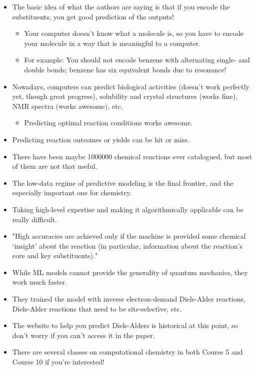 \documentclass[../notes.tex]{subfiles}
\begin{document}
\begin{itemize}
\begin{itemize}
    \end{itemize}
    \item The basic idea of what the authors are saying is that if you encode the substituents, you get good prediction of the outputs!
    \begin{itemize}
        \item Your computer doesn't know what a molecule is, so you have to encode your molecule in a way that is meaningful to a computer.
        \item For example: You should not encode benzene with alternating single- and double bonds; benzene has six equivalent bonds due to resonance!
    \end{itemize}
    \item Nowadays, computers can predict biological activities (doesn't work perfectly yet, though great progress), solubility and crystal structures (works fine), NMR spectra (works awesome), etc.
    \begin{itemize}
        \item Predicting optimal reaction conditions works awesome.
    \end{itemize}
    \item Predicting reaction outcomes or yields can be hit or miss.
    \item There have been maybe \num{1000000} chemical reactions ever catalogued, but most of them are not that useful.
    \item The low-data regime of predictive modeling is the final frontier, and the especially important one for chemistry.
    \item Taking high-level expertise and making it algorithmically applicable can be really difficult.
    \item "High accuracies are achieved only if the machine is provided some chemical `insight' about the reaction (in particular, information about the reaction's core and key substituents)."
    \item While ML models cannot provide the generality of quantum mechanics, they work much faster.
    \item They trained the model with inverse electron-demand Diels-Alder reactions, Diels-Alder reactions that need to be site-selective, etc.
    \item The website to help you predict Diels-Alders is historical at this point, so don't worry if you can't access it in the paper.
    \item There are several classes on computational chemistry in both Course 5 and Course 10 if you're interested!

\end{itemize}
\end{document}

